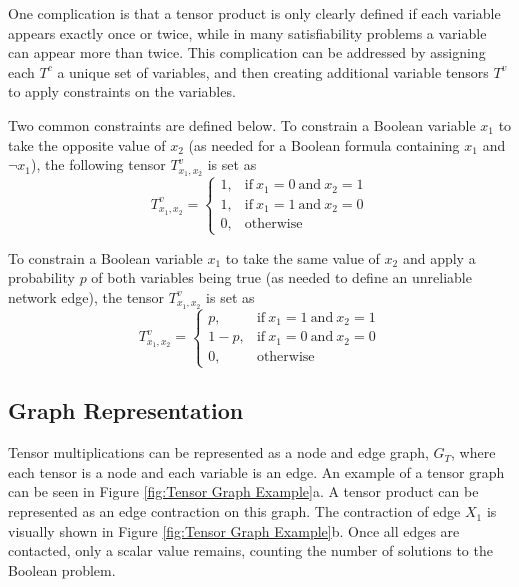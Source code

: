 One complication is that a tensor product is only clearly defined if each variable appears exactly once or twice, while in many satisfiability problems a variable can appear more than twice. This complication can be addressed by assigning each \(T^c\) a unique set of variables, and then creating additional variable tensors \(T^v\) to apply constraints on the variables.

Two common constraints are defined below. To constrain a Boolean variable \(x_1\) to take the opposite value of \(x_2\) (as needed for a Boolean formula containing \(x_1\) and \(\neg x_1\)), the following tensor \(T^v_{x_1,x_2}\) is set as \begin{equation*}
T^v_{x_1,x_2}=
\begin{cases}
  1, & \text{if}\ x_1=0\ \text{and}\ x_2=1\\
  1, & \text{if}\ x_1=1\ \text{and}\ x_2=0\\
  0, & \text{otherwise}
\end{cases}
\end{equation*}

To constrain a Boolean variable \(x_1\) to take the same value of \(x_2\) and apply a probability \(p\) of both variables being true (as needed to define an unreliable network edge), the tensor \(T^v_{x_1,x_2}\) is set as \begin{equation*}
T^v_{x_1,x_2}=
\begin{cases}
    p, & \text{if}\ x_1=1\ \text{and}\ x_2=1 \\
    1-p, & \text{if}\ x_1=0\ \text{and}\ x_2=0 \\
    0, & \text{otherwise}
\end{cases}
\end{equation*}

\hypertarget{graph-representation}{%
\subsection{Graph Representation}\label{graph-representation}}

Tensor multiplications can be represented as a node and edge graph, \(G_T\), where each tensor is a node and each variable is an edge. An example of a tensor graph can be seen in Figure \ref{fig:Tensor Graph Example}a. A tensor product can be represented as an edge contraction on this graph. The contraction of edge \(X_1\) is visually shown in Figure \ref{fig:Tensor Graph Example}b. Once all edges are contacted, only a scalar value remains, counting the number of solutions to the Boolean problem.

